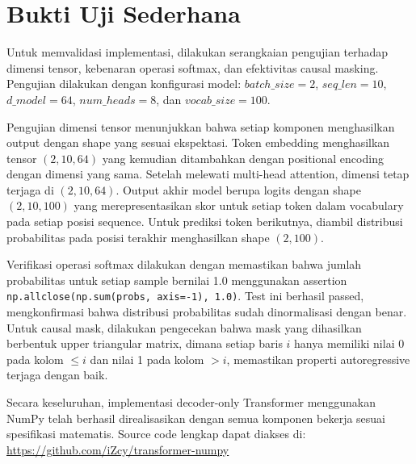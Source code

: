 \documentclass[11pt,a4paper]{article}
\begin{document}
\section{Bukti Uji Sederhana}

Untuk memvalidasi implementasi, dilakukan serangkaian pengujian terhadap dimensi tensor, kebenaran operasi softmax, dan efektivitas causal masking. Pengujian dilakukan dengan konfigurasi model: $batch\_size=2$, $seq\_len=10$, $d\_model=64$, $num\_heads=8$, dan $vocab\_size=100$.

Pengujian dimensi tensor menunjukkan bahwa setiap komponen menghasilkan output dengan shape yang sesuai ekspektasi. Token embedding menghasilkan tensor $(2, 10, 64)$ yang kemudian ditambahkan dengan positional encoding dengan dimensi yang sama. Setelah melewati multi-head attention, dimensi tetap terjaga di $(2, 10, 64)$. Output akhir model berupa logits dengan shape $(2, 10, 100)$ yang merepresentasikan skor untuk setiap token dalam vocabulary pada setiap posisi sequence. Untuk prediksi token berikutnya, diambil distribusi probabilitas pada posisi terakhir menghasilkan shape $(2, 100)$.

Verifikasi operasi softmax dilakukan dengan memastikan bahwa jumlah probabilitas untuk setiap sample bernilai 1.0 menggunakan assertion \texttt{np.allclose(np.sum(probs, axis=-1), 1.0)}. Test ini berhasil passed, mengkonfirmasi bahwa distribusi probabilitas sudah dinormalisasi dengan benar. Untuk causal mask, dilakukan pengecekan bahwa mask yang dihasilkan berbentuk upper triangular matrix, dimana setiap baris $i$ hanya memiliki nilai 0 pada kolom $\leq i$ dan nilai 1 pada kolom $> i$, memastikan properti autoregressive terjaga dengan baik.

Secara keseluruhan, implementasi decoder-only Transformer menggunakan NumPy telah berhasil direalisasikan dengan semua komponen bekerja sesuai spesifikasi matematis. Source code lengkap dapat diakses di: \url{https://github.com/iZcy/transformer-numpy}
\end{document}
